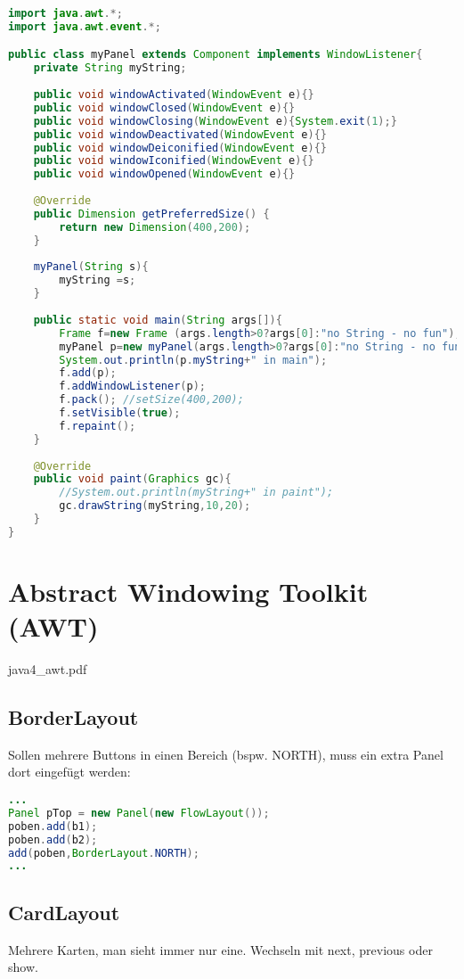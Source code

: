 \begin{lstlisting}[language=Java]
import java.awt.*;
import java.awt.event.*;

public class myPanel extends Component implements WindowListener{
	private String myString;
	
	public void windowActivated(WindowEvent e){}
	public void windowClosed(WindowEvent e){}
	public void windowClosing(WindowEvent e){System.exit(1);}
	public void windowDeactivated(WindowEvent e){}
	public void windowDeiconified(WindowEvent e){}
	public void windowIconified(WindowEvent e){}
	public void windowOpened(WindowEvent e){}
	
	@Override
	public Dimension getPreferredSize()	{
		return new Dimension(400,200);
	}
	
	myPanel(String s){
		myString =s;
	}
	
	public static void main(String args[]){
		Frame f=new Frame (args.length>0?args[0]:"no String - no fun");
		myPanel p=new myPanel(args.length>0?args[0]:"no String - no fun");
		System.out.println(p.myString+" in main");
		f.add(p);
		f.addWindowListener(p);
		f.pack(); //setSize(400,200);
		f.setVisible(true);
		f.repaint();
	}
	
	@Override
	public void paint(Graphics gc){
		//System.out.println(myString+" in paint");
		gc.drawString(myString,10,20);
	}
}
\end{lstlisting}

\section{Abstract Windowing Toolkit (AWT)}
java4\_awt.pdf
\subsection{BorderLayout}
Sollen mehrere Buttons in einen Bereich (bspw. NORTH), muss ein extra Panel dort eingefügt werden:
\begin{lstlisting}[language=Java]
...
Panel pTop = new Panel(new FlowLayout());
poben.add(b1);
poben.add(b2);
add(poben,BorderLayout.NORTH);
...
\end{lstlisting}

\subsection{CardLayout}
Mehrere Karten, man sieht immer nur eine. Wechseln mit next, previous oder show.

